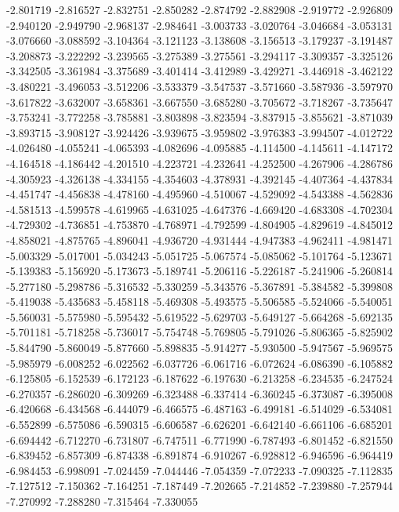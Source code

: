-2.801719
-2.816527
-2.832751
-2.850282
-2.874792
-2.882908
-2.919772
-2.926809
-2.940120
-2.949790
-2.968137
-2.984641
-3.003733
-3.020764
-3.046684
-3.053131
-3.076660
-3.088592
-3.104364
-3.121123
-3.138608
-3.156513
-3.179237
-3.191487
-3.208873
-3.222292
-3.239565
-3.275389
-3.275561
-3.294117
-3.309357
-3.325126
-3.342505
-3.361984
-3.375689
-3.401414
-3.412989
-3.429271
-3.446918
-3.462122
-3.480221
-3.496053
-3.512206
-3.533379
-3.547537
-3.571660
-3.587936
-3.597970
-3.617822
-3.632007
-3.658361
-3.667550
-3.685280
-3.705672
-3.718267
-3.735647
-3.753241
-3.772258
-3.785881
-3.803898
-3.823594
-3.837915
-3.855621
-3.871039
-3.893715
-3.908127
-3.924426
-3.939675
-3.959802
-3.976383
-3.994507
-4.012722
-4.026480
-4.055241
-4.065393
-4.082696
-4.095885
-4.114500
-4.145611
-4.147172
-4.164518
-4.186442
-4.201510
-4.223721
-4.232641
-4.252500
-4.267906
-4.286786
-4.305923
-4.326138
-4.334155
-4.354603
-4.378931
-4.392145
-4.407364
-4.437834
-4.451747
-4.456838
-4.478160
-4.495960
-4.510067
-4.529092
-4.543388
-4.562836
-4.581513
-4.599578
-4.619965
-4.631025
-4.647376
-4.669420
-4.683308
-4.702304
-4.729302
-4.736851
-4.753870
-4.768971
-4.792599
-4.804905
-4.829619
-4.845012
-4.858021
-4.875765
-4.896041
-4.936720
-4.931444
-4.947383
-4.962411
-4.981471
-5.003329
-5.017001
-5.034243
-5.051725
-5.067574
-5.085062
-5.101764
-5.123671
-5.139383
-5.156920
-5.173673
-5.189741
-5.206116
-5.226187
-5.241906
-5.260814
-5.277180
-5.298786
-5.316532
-5.330259
-5.343576
-5.367891
-5.384582
-5.399808
-5.419038
-5.435683
-5.458118
-5.469308
-5.493575
-5.506585
-5.524066
-5.540051
-5.560031
-5.575980
-5.595432
-5.619522
-5.629703
-5.649127
-5.664268
-5.692135
-5.701181
-5.718258
-5.736017
-5.754748
-5.769805
-5.791026
-5.806365
-5.825902
-5.844790
-5.860049
-5.877660
-5.898835
-5.914277
-5.930500
-5.947567
-5.969575
-5.985979
-6.008252
-6.022562
-6.037726
-6.061716
-6.072624
-6.086390
-6.105882
-6.125805
-6.152539
-6.172123
-6.187622
-6.197630
-6.213258
-6.234535
-6.247524
-6.270357
-6.286020
-6.309269
-6.323488
-6.337414
-6.360245
-6.373087
-6.395008
-6.420668
-6.434568
-6.444079
-6.466575
-6.487163
-6.499181
-6.514029
-6.534081
-6.552899
-6.575086
-6.590315
-6.606587
-6.626201
-6.642140
-6.661106
-6.685201
-6.694442
-6.712270
-6.731807
-6.747511
-6.771990
-6.787493
-6.801452
-6.821550
-6.839452
-6.857309
-6.874338
-6.891874
-6.910267
-6.928812
-6.946596
-6.964419
-6.984453
-6.998091
-7.024459
-7.044446
-7.054359
-7.072233
-7.090325
-7.112835
-7.127512
-7.150362
-7.164251
-7.187449
-7.202665
-7.214852
-7.239880
-7.257944
-7.270992
-7.288280
-7.315464
-7.330055
